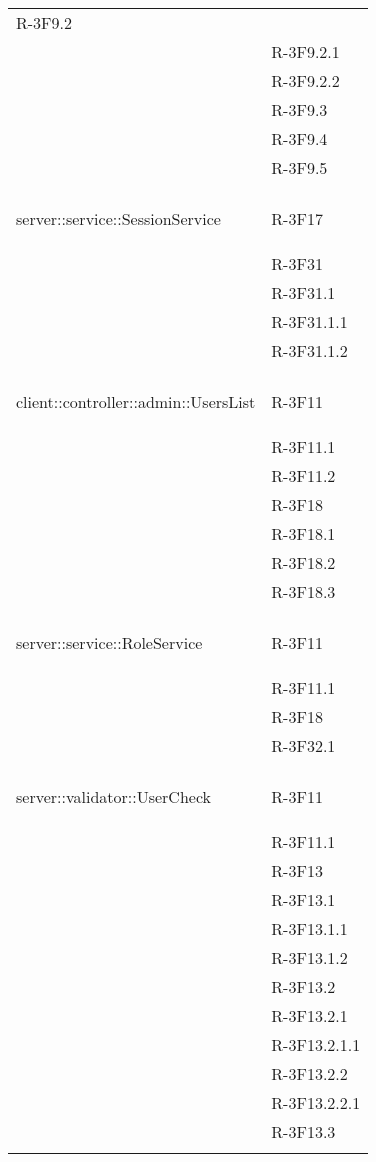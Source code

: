 \begin{longtable}{l p{3cm}}
	R-3F9.2 \tabularnewline &
	
	R-3F9.2.1 \tabularnewline &
	
	R-3F9.2.2 \tabularnewline &
	
	R-3F9.3 \tabularnewline &
	
	R-3F9.4 \tabularnewline &
	
	R-3F9.5 \tabularnewline &\tabularnewline
	\hline
	\hypertarget{server::service::SessionService}{server::service::SessionService} & R-3F17 \tabularnewline &
	
	R-3F31 \tabularnewline &
	
	R-3F31.1 \tabularnewline &
	
	R-3F31.1.1 \tabularnewline &
	
	R-3F31.1.2 \tabularnewline &\tabularnewline
	\hline
	\hypertarget{client::controller::admin::UsersList}{client::controller::admin::UsersList} & R-3F11 \tabularnewline &
	
	R-3F11.1 \tabularnewline &
	
	R-3F11.2 \tabularnewline &
	
	R-3F18 \tabularnewline &
	
	R-3F18.1 \tabularnewline &
	
	R-3F18.2 \tabularnewline &
	
	R-3F18.3 \tabularnewline &\tabularnewline
	\hline
	\hypertarget{server::service::RoleService}{server::service::RoleService} & R-3F11 \tabularnewline &
	
	R-3F11.1 \tabularnewline &
	
	R-3F18 \tabularnewline &
	
	R-3F32.1 \tabularnewline &\tabularnewline
	\hline
	\hypertarget{server::validator::UserCheck}{server::validator::UserCheck} & R-3F11 \tabularnewline &
	
	R-3F11.1 \tabularnewline &
	
	R-3F13 \tabularnewline &
	
	R-3F13.1 \tabularnewline &
	
	R-3F13.1.1 \tabularnewline &
	
	R-3F13.1.2 \tabularnewline &
	
	R-3F13.2 \tabularnewline &
	
	R-3F13.2.1 \tabularnewline &
	
	R-3F13.2.1.1 \tabularnewline &
	
	R-3F13.2.2 \tabularnewline &
	
	R-3F13.2.2.1 \tabularnewline &
	
	R-3F13.3 \tabularnewline &
	

\end{longtable}
